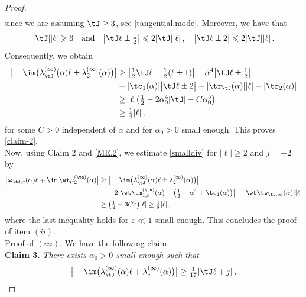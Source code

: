 \documentclass[a4paper,reqno,10pt]{article}
\newcommand{\bomega}{{\boldsymbol{\omega}}}
\begin{document}
\begin{proof}
\begin{align}
  	\end{align}
  	since we are assuming $\tJ \geq 3$, see \eqref{tangential.mode}. Moreover, we have that
  	\begin{equation}
  	|\tJ||\ell|\geqslant6\quad\hbox{and}\quad	\big|  \tJ \ell \pm \tfrac12  \big| \leqslant 2|\tJ| |\ell| \,, \quad \big|  \tJ \ell \pm 2 \big| \leqslant 2|\tJ| |\ell| \,.
  	\end{equation}
  	Consequently, we obtain
  	\begin{align}
  		\big|  	-\im\big(  \lambda_{\tJ}^{(\infty)}(\alpha) \ell  \pm \lambda_{2}^{(\infty)} (\alpha) \big)   \big| &\geq  \big|   \tfrac12 \tJ \ell - \tfrac12 (\ell\pm 1)  \big|  - \alpha^4 	\big|  \tJ \ell \pm \tfrac12  \big| \\& - |\tc_{1}(\alpha)| \big| \tJ\ell \pm 2 \big| - |\tr_{\tJ}(\alpha)| |\ell| - |\tr_{2}(\alpha)| \\
  		& \geq  |\ell| \big( \tfrac12 - 2 \alpha_{0}^4  |\tJ|  -C \alpha_{0}^5   \big) \\
  		& \geq \tfrac14 |\ell| \,,
  	\end{align}
  	for some $C>0$ independent of $\alpha$ and for $\alpha_{0}>0$ small enough. This proves \eqref{claim-2}.
    \\[1mm]
   Now, using Claim 2 and  \eqref{ME.2}, we estimate \eqref{smalldiv} for $|\ell| \geq 2$ and $j= \pm 2$ by
   	 \begin{align}
   		\big| \bomega_{\tJ,\varepsilon}(\alpha)  \ell \mp \im\,\wt\mu_{2}^{(\tn)}(\alpha) \big| &  \geq \big| -\im \big( \lambda_{\tJ}^{(\infty)}(\alpha)  \ell \pm \lambda_{2}^{(\infty)}(\alpha) \big) \big| \\
   		& \quad- 2 \big| \wt\tm_{1,\varepsilon}^{(\tn)}(\alpha) - \big( \tfrac12 -\alpha^4 + \tc_{1}(\alpha) \big)  \big|  - |\wt\tw_{\tJ,\infty}(\alpha)| |\ell|  \\
   		& \geq \big( \tfrac14 - 3C\varepsilon   \big)|\ell| \geq \tfrac18 |\ell| \,,
   	\end{align}
   	where the last inequality holds for $\varepsilon \ll 1$ small enough. This concludes the proof of item $(ii)$.
   	\\[1mm]
   	{\sc Proof of $(iii)$}. We have the following claim.
   	\\[1mm]
   	{\bf Claim 3.} {\it There exists $\alpha_{0}>0$ small enough such that}
   	\begin{equation}\label{claim-3}
   			\big|  	-\im\big(  \lambda_{\tJ}^{(\infty)}(\alpha) \ell  + \lambda_{j}^{(\infty)} (\alpha) \big)   \big| \geq  \tfrac{1}{17} |\tJ\ell+j|\,,

\end{equation}
\end{proof}
\end{document}
